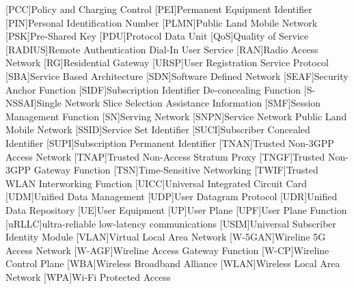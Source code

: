 \begin{multicols}{2}
\begin{acronym}[AAAAAA]
        [PCC]{Policy and Charging Control}
        [PEI]{Permanent Equipment Identifier}
        [PIN]{Personal Identification Number}
        [PLMN]{Public Land Mobile Network}
        [PSK]{Pre-Shared Key}
        [PDU]{Protocol Data Unit}
        [QoS]{Quality of Service}
        [RADIUS]{Remote Authentication Dial-In User Service}
        [RAN]{Radio Access Network}
        [RG]{Residential Gateway}
        [URSP]{User Registration Service Protocol}
        [SBA]{Service Based Architecture}
        [SDN]{Software Defined Network}
        [SEAF]{Security Anchor Function}
        [SIDF]{Subscription Identifier De-concealing Function}
        [S-NSSAI]{Single Network Slice Selection Assistance Information}
        [SMF]{Session Management Function}
        [SN]{Serving Network}
        [SNPN]{Service Network Public Land Mobile Network}
        [SSID]{Service Set Identifier}
        [SUCI]{Subscriber Concealed Identifier}
        [SUPI]{Subscription Permanent Identifier}
        [TNAN]{Trusted Non-3GPP Access Network}
        [TNAP]{Trusted Non-Access Stratum Proxy}
        [TNGF]{Trusted Non-3GPP Gateway Function}
        [TSN]{Time-Sensitive Networking}
        [TWIF]{Trusted WLAN Interworking Function}
        [UICC]{Universal Integrated Circuit Card}
        [UDM]{Unified Data Management}
        [UDP]{User Datagram Protocol}
        [UDR]{Unified Data Repository}
        [UE]{User Equipment}
        [UP]{User Plane}
        [UPF]{User Plane Function}
        [uRLLC]{ultra-reliable low-latency communications}
        [USIM]{Universal Subscriber Identity Module}
        [VLAN]{Virtual Local Area Network}
        [W-5GAN]{Wireline 5G Access Network}
        [W-AGF]{Wireline Access Gateway Function}
        [W-CP]{Wireline Control Plane}
        [WBA]{Wireless Broadband Alliance}
        [WLAN]{Wireless Local Area Network}
        [WPA]{Wi-Fi Protected Access}
    \end{acronym}
\end{multicols}